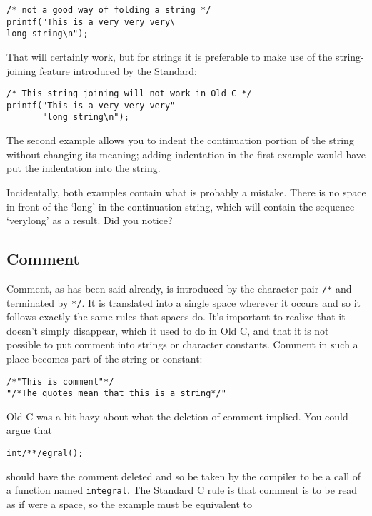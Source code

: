    \begin{Verbatim}
/* not a good way of folding a string */
printf("This is a very very very\
long string\n");
\end{Verbatim}

   That will certainly work, but for strings it is preferable to make use
    of the string-joining feature introduced by the Standard:


   \begin{Verbatim}
/* This string joining will not work in Old C */
printf("This is a very very very"
       "long string\n");
\end{Verbatim}

   The second example allows you to indent the continuation portion of the
    string without changing its meaning; adding indentation in the first
    example would have put the indentation into the string.


   Incidentally, both examples contain what is probably a mistake. There
    is no space in front of the `long' in the continuation string,
    which will contain the sequence `verylong' as a result. Did you
    notice?


  

  \subsection{Comment}
   

   Comment, as has been said already, is introduced by the character
    pair \texttt{/*} and terminated by \texttt{*/}. It is
    translated into a single space wherever it occurs and so it follows
    exactly the same rules that spaces do. It's important to realize that it
    doesn't simply disappear, which it used to do in Old C, and that it
    is not possible to put comment into strings or character constants.
    Comment in such a place becomes part of the string or constant:


   \begin{Verbatim}
/*"This is comment"*/
"/*The quotes mean that this is a string*/"
\end{Verbatim}

   Old C was a bit hazy about what the deletion of comment implied.
    You could argue that


   \begin{Verbatim}
int/**/egral();
\end{Verbatim}

   should have the comment deleted and so be taken by the compiler to be a
    call of a function named \texttt{integral}. The Standard C rule is
    that comment is to be read as if were a space, so the example must be
    equivalent to


